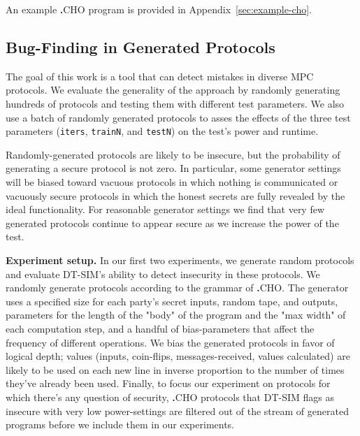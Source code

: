 \documentclass[compsoc, conference, a4paper, 10pt, times]{IEEEtran}
\renewcommand{\paragraph}[1]{\vspace*{2pt}\noindent\textbf{#1}}
\newcommand{\langname}{\textsc{\textbf{.}CHO}\xspace}
\newcommand{\toolname}{\textsc{DT-SIM}\xspace}
\begin{document}
An example \langname program is provided in Appendix~\ref{sec:example-cho}.

\subsection{Bug-Finding in Generated Protocols}
\label{sec:random-protocols}

The goal of this work is a tool that can detect mistakes in diverse MPC protocols.
We evaluate the generality of the approach by randomly generating hundreds of protocols and testing them with different test parameters.
We also use a batch of randomly generated protocols to asses the effects of the three test parameters
(\texttt{iters}, \texttt{trainN}, and \texttt{testN})
on the test's power and runtime.

Randomly-generated protocols are likely to be insecure, but the probability of generating a secure protocol is not zero.
In particular, some generator settings will be biased toward vacuous protocols in which nothing is communicated
or vacuously secure protocols in which the honest secrets are fully revealed by the ideal functionality.
For reasonable generator settings we find that very few generated protocols
continue to appear secure as we increase the power of the test.

\paragraph{Experiment setup.}
In our first two experiments, we generate random protocols and evaluate \toolname's ability to detect insecurity in these protocols.
We randomly generate protocols according to the grammar of \langname.
The generator uses a specified size for each party's secret inputs, random tape, and outputs,
parameters for the length of the "body" of the program and the "max width" of each computation step,
and a handful of bias-parameters that affect the frequency of different operations.
We bias the generated protocols in favor of logical depth;
values (inputs, coin-flips, messages-received, values calculated) are likely
to be used on each new line in inverse proportion to the number of times they've already been used.
Finally, to focus our experiment on protocols for which there's any question of security,
\langname protocols that \toolname flags as insecure with very low power-settings
are filtered out of the stream of generated programs before we include them in our experiments.
\end{document}
